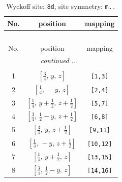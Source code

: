 \documentclass[fleqn,8pt]{jsarticle}
\begin{document}
\begin{longtable}{ccc}
\caption{Wyckoff site: {\tt 8d}, site symmetry: {\tt m..}}
 \\
 \hline \hline
No. & position & mapping \\ \hline \endfirsthead

\multicolumn{2}{l}{\tablename\ \thetable{}} \\
 \hline \hline
No. & position & mapping \\ \hline \endhead

 \hline \hline
\multicolumn{2}{r}{\footnotesize\it continued ...} \\ \endfoot

 \hline \hline
\multicolumn{2}{r}{} \\ \endlastfoot

1 & $\left[ \frac{3}{4},\, y,\, z \right]$ & {\tt [1,3]} \\ \hline
2 & $\left[ \frac{1}{4},\, - y,\, z \right]$ & {\tt [2,4]} \\ \hline
3 & $\left[ \frac{1}{4},\, y + \frac{1}{2},\, z + \frac{1}{2} \right]$ & {\tt [5,7]} \\ \hline
4 & $\left[ \frac{3}{4},\, \frac{1}{2} - y,\, z + \frac{1}{2} \right]$ & {\tt [6,8]} \\ \hline
5 & $\left[ \frac{3}{4},\, y,\, z + \frac{1}{2} \right]$ & {\tt [9,11]} \\ \hline
6 & $\left[ \frac{1}{4},\, - y,\, z + \frac{1}{2} \right]$ & {\tt [10,12]} \\ \hline
7 & $\left[ \frac{1}{4},\, y + \frac{1}{2},\, z \right]$ & {\tt [13,15]} \\ \hline
8 & $\left[ \frac{3}{4},\, \frac{1}{2} - y,\, z \right]$ & {\tt [14,16]} \\
\end{longtable}
\renewcommand{\arraystretch}{1.2}
\end{document}
